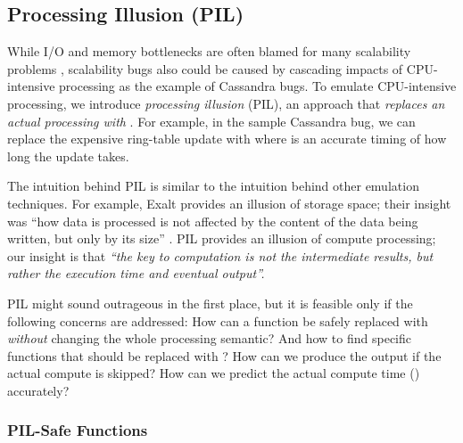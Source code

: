 

\subsection{Processing Illusion (PIL)}
\label{sc-pil}

While I/O and memory bottlenecks are often blamed for many scalability problems
\cite{Ousterhout+15-MakingSense,Konstantin+10-HDFSScalability, Wang+14-Exalt},
scalability bugs also could be caused by cascading impacts of CPU-intensive
processing as the example of Cassandra bugs.
%
To emulate CPU-intensive processing, we introduce {\em processing illusion}
(PIL), an approach that {\em replaces an actual processing with \sleep}.  For
example, in the sample Cassandra bug, we can replace the expensive ring-table
update with  where  is an accurate timing of how long the
update takes.


The intuition behind PIL is similar to the intuition behind other
emulation techniques.
%
For example, Exalt provides an illusion of storage space; their insight
was ``how data is processed is  not affected by the content of the data
being written, but only by its size'' \cite{Wang+14-Exalt}.
%
PIL provides an illusion of compute processing; our insight is that
{\em ``the
  key to computation is not the intermediate results, but rather the
  execution time and eventual output''.}
%

PIL might sound outrageous in the first place, but it is feasible only if 
the following concerns are addressed:
%
%
How can a function be safely replaced with \sleep \textit{without} changing the
whole processing semantic?  And how to find specific functions that should be
replaced with \sleep?
%
How can we produce the output if the actual compute is skipped?
%
How can we predict the actual compute time () accurately?

\subsubsection{PIL-Safe Functions}
\label{sc-pil-1}

